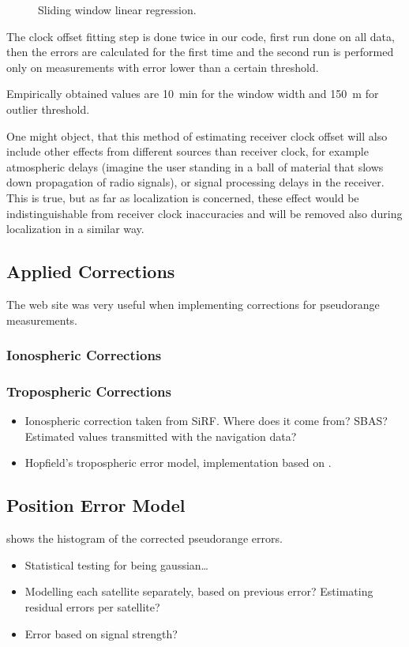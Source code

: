 \begin{figure}[h]
	\centering
	
	\caption{Sliding window linear regression.}
	\label{fig:sliding-window-linear-regression}
\end{figure}

The clock offset fitting step is done twice in our code, first run done on
all data, then the errors are calculated for the first time and the second run
is performed only on measurements with error lower than a certain threshold.

Empirically obtained values are \SI{10}{\minute} for the window width and
\SI{150}{\meter} for outlier threshold.

One might object, that this method of estimating receiver clock offset will
also include other effects from different sources than receiver clock,
for example atmospheric delays (imagine the user standing in a ball of material
that slows down propagation of radio signals), or signal processing delays
in the receiver.
This is true, but as far as localization is concerned, these effect would
be indistinguishable from receiver clock inaccuracies and will be
removed also during localization in a similar way.

\subsection{Applied Corrections}
\label{sec:impl-corrections}
The web site \cite{sam-www} was very useful when implementing corrections for
pseudorange measurements.

\subsubsection{Ionospheric Corrections}

\subsubsection{Tropospheric Corrections}
\begin{itemize}
\item Ionospheric correction taken from SiRF. Where does it come from? SBAS?
    Estimated values transmitted with the navigation data?
\item Hopfield's tropospheric error model, implementation based on \cite{sam-www}.
\end{itemize}

\subsection{Position Error Model}
 shows the histogram of the corrected pseudorange
errors.
\begin{itemize}
\item Statistical testing for being gaussian\ldots
\item Modelling each satellite separately, based on previous error?
      Estimating residual errors per satellite?
\item Error based on signal strength?
\end{itemize}

